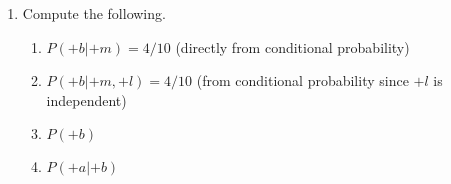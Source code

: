 \documentclass[12pt]{article}
\begin{document}
\begin{enumerate}
Fill in the joint distribution table below.

\begin{center}
\begin{tabular}{cc}
\begin{tabular}{|c|c|c|c||c|} \hline
$L$  & $M$   & $B$  & $A$  & $P(L, M, B, A)$ \\ \hline \hline
$+l$ & $+m$  & $+b$ & $+a$ &                 \\ \hline
$+l$ & $+m$  & $+b$ & $-a$ &                 \\ \hline
$+l$ & $+m$  & $-b$ & $+a$ &                 \\ \hline
$+l$ & $+m$  & $-b$ & $-a$ &                 \\ \hline
$+l$ & $-m$  & $+b$ & $+a$ &                 \\ \hline
$+l$ & $-m$  & $+b$ & $-a$ &                 \\ \hline
$+l$ & $-m$  & $-b$ & $+a$ &                 \\ \hline
$+l$ & $-m$  & $-b$ & $-a$ &                 \\ \hline
\end{tabular} &
\begin{tabular}{|c|c|c|c||c|} \hline
$L$  & $M$   & $B$  & $A$  & $P(L, M, B, A)$ \\ \hline \hline
$-l$ & $+m$  & $+b$ & $+a$ &                 \\ \hline
$-l$ & $+m$  & $+b$ & $-a$ &                 \\ \hline
$-l$ & $+m$  & $-b$ & $+a$ &                 \\ \hline
$-l$ & $+m$  & $-b$ & $-a$ &                 \\ \hline
$-l$ & $-m$  & $+b$ & $+a$ &                 \\ \hline
$-l$ & $-m$  & $+b$ & $-a$ &                 \\ \hline
$-l$ & $-m$  & $-b$ & $+a$ &                 \\ \hline
$-l$ & $-m$  & $-b$ & $-a$ &                 \\ \hline
\end{tabular}
\end{tabular}
\end{center}

\item Compute the following.

      \begin{enumerate}

      \item $P(+b | +m) = 4/10$ (directly from conditional probability)

      \item $P(+b | +m, +l) = 4/10$ (from conditional probability since $+l$ is independent)

      \item $P(+b)$

      \item $P(+a | +b)$

      \end{enumerate}

\end{enumerate}
\end{document}
